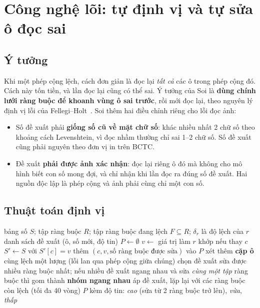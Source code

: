 \documentclass[12pt,a4paper]{report}
\begin{document}
\section{Công nghệ lõi: tự định vị và tự sửa ô đọc sai}\label{sec:loi}
\subsection{Ý tưởng}
Khi một phép cộng lệch, cách đơn giản là đọc lại \emph{tất cả} các ô trong phép cộng đó. Cách này tốn tiền, và lần đọc
lại cũng có thể sai. Ý tưởng của Soi là \textbf{dùng chính lưới ràng buộc để khoanh vùng ô sai trước}, rồi mới đọc lại,
theo nguyên lý định vị lỗi của Fellegi--Holt~\cite{fellegi1976}. Soi thêm hai điều chỉnh riêng cho lỗi đọc ảnh:
\begin{itemize}
  \item Số đề xuất phải \textbf{giống số cũ về mặt chữ số}: khác nhiều nhất 2 chữ số theo khoảng cách Levenshtein, vì
        đọc nhầm thường chỉ sai 1--2 chữ số. Số đề xuất cũng phải nguyên theo đơn vị in trên BCTC.
  \item Đề xuất \textbf{phải được ảnh xác nhận}: đọc lại riêng ô đó mà không cho mô hình biết con số mong đợi, và chỉ
        nhận khi lần đọc ra đúng số đề xuất. Hai nguồn độc lập là phép cộng và ảnh phải cùng chỉ một con số.
\end{itemize}

\subsection{Thuật toán định vị}
\begin{algorithm}[H]
\caption{Định vị ô đọc sai bằng ràng buộc (rút gọn)}\label{alg:localize}
\begin{algorithmic}[1]
\Require bảng số $S$; tập ràng buộc $R$; tập ràng buộc đang lệch $F \subseteq R$; $\delta_r$ là độ lệch của $r$
\Ensure danh sách đề xuất (ô, số mới, độ tin)
\State $P \gets \emptyset$
  \State $v \gets$ giá trị làm $r$ khớp nếu thay $c$ 
     \State $S' \gets S$ với $S'[c] = v$
        \State thêm $(c, v, \text{số ràng buộc được sửa})$ vào $P$
     \EndIf
  \EndIf
\EndFor
\State xét thêm \textbf{cặp ô} cùng lệch một lượng (lỗi lan qua phép cộng giữa chúng)
\State chọn đề xuất sửa được nhiều ràng buộc nhất; nếu nhiều đề xuất ngang nhau và sửa \emph{cùng một tập} ràng buộc
       thì gom thành \textbf{nhóm ngang nhau}
\State áp đề xuất, lặp lại với các ràng buộc còn lệch (tối đa 40 vòng)
\State \Return $P$ kèm độ tin: \emph{cao} (sửa từ 2 ràng buộc trở lên), \emph{vừa}, \emph{thấp}
\end{algorithmic}
\end{algorithm}
\end{document}
